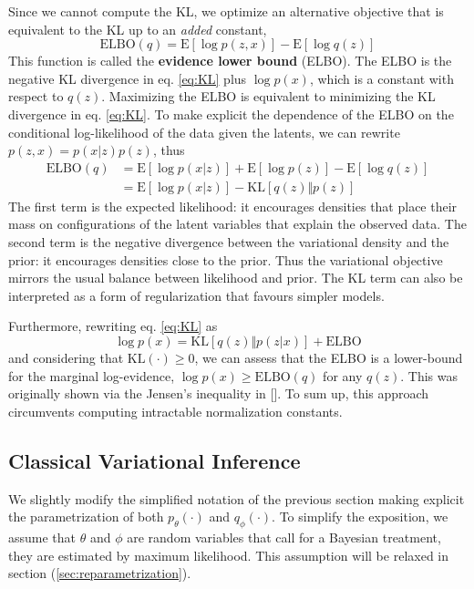 Since we cannot compute the KL, we optimize an alternative objective that is equivalent to the KL up to an \textit{added} constant,
$$\mathrm{ELBO}(q) = \mathrm{E}[\log p(z, x)] - \mathrm{E}[\log q(z)]$$
This function is called the \textbf{evidence lower bound} (ELBO). The ELBO is the negative KL divergence in eq. \eqref{eq:KL} plus $\log p(x)$, which is a constant with respect to $q(z)$. Maximizing the ELBO is equivalent to minimizing the KL divergence in eq. \eqref{eq:KL}. To make explicit the dependence of the ELBO on the conditional log-likelihood of the data given the latents, we can rewrite $p(z,x) = p(x|z)p(z)$, thus
\begin{align}
    \mathrm{ELBO}(q) &= \mathrm{E}[\log p(x|z)] + \mathrm{E}[\log p(z)] - \mathrm{E}[\log q(z)] \nonumber\\
                &= \mathrm{E}[\log p(x|z)] - \mathrm{KL} [q(z)\Vert p(z)] \label{eq:ELBO}
\end{align}
The first term is the expected likelihood: it encourages densities that place their mass on configurations of the latent variables that explain the observed data. The second term is the negative divergence between the variational density and the prior: it encourages densities close to the prior. Thus the variational objective mirrors the usual balance between likelihood and prior. The KL term can also be interpreted as a form of regularization that favours simpler models. 

Furthermore, rewriting eq. \eqref{eq:KL} as 
$$\log p(x) = \mathrm{KL} [q(z)\Vert p(z | x)] + \mathrm{ELBO}$$
and considering that $\mathrm{KL}(\cdot) \geq 0$, we can assess that the ELBO is a lower-bound for the marginal log-evidence, $\log p(x) \geq \mathrm{ELBO}(q)$ for any $q(z)$. This was originally shown via the Jensen's inequality in [\cite{Jordan1999}]. To sum up, this approach circumvents computing intractable normalization constants. 



\subsection{Classical Variational Inference}
We slightly modify the simplified notation of the previous section making explicit the parametrization of both $p_\theta(\cdot)$ and $q_\phi(\cdot)$. To simplify the exposition, we assume that $\theta$ and $\phi$ are random variables that call for a Bayesian treatment, they are estimated by maximum likelihood. This assumption will be relaxed in section (\cref{sec:reparametrization}). 

